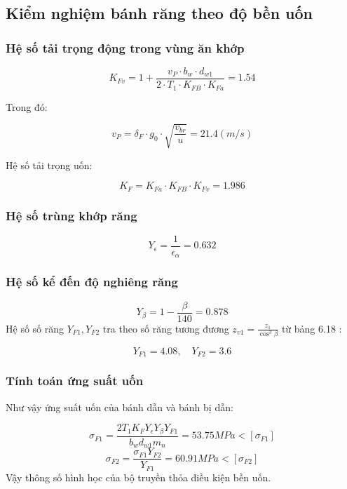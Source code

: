 \subsection{Kiểm nghiệm bánh răng theo độ bền uốn}

\subsubsection{Hệ số tải trọng động trong vùng ăn khớp}

\[
K_{Fv} = 1 + \frac{v_P \cdot b_w \cdot d_{w1}}{2 \cdot T_1 \cdot K_{FB} \cdot K_{Fa}} = 1.54
\]

Trong đó:

\[
v_P = \delta_F \cdot g_0 \cdot \sqrt{\frac{v_{br}}{u}} = 21.4(m/s)
\]

Hệ số tải trọng uốn:

\[
K_F = K_{Fa} \cdot K_{FB} \cdot K_{Fv} = 1.986
\]

\subsubsection{Hệ số trùng khớp răng}

\[
Y_\epsilon = \frac{1}{\epsilon_\alpha} = 0.632
\]

\subsubsection{Hệ số kể đến độ nghiêng răng}

\[
Y_\beta = 1 - \frac{\beta}{140} = 0.878
\]
Hệ số số răng $Y_{F1}, Y_{F2}$ tra theo số răng tương đương $z_{v1} = \frac{z_1}{\cos^3 \beta}$ từ bảng 6.18 \cite{reference}:

\[
Y_{F1} = 4.08, \quad Y_{F2} = 3.6
\]

\subsubsection{Tính toán ứng suất uốn}

Như vậy ứng suất uốn của bánh dẫn và bánh bị dẫn:

\[
\sigma_{F1} = \frac{2T_1 K_F Y_\epsilon Y_\beta Y_{F1}}{b_w d_{w1} m_n} = 53.75 MPa < [\sigma_{F1}]
\]
\[
\sigma_{F2} = \frac{\sigma_{F1} Y_{F2}}{Y_{F1}} = 60.91 MPa < [\sigma_{F2}]
\]
Vậy thông số hình học của bộ truyền thỏa điều kiện bền uốn.
\cleardoublepage